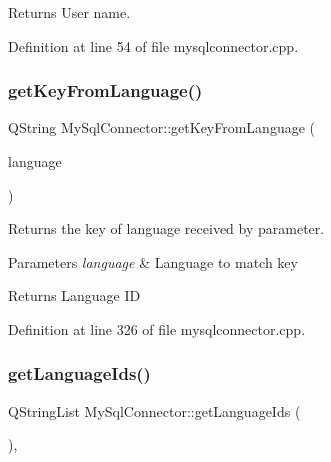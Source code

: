 \begin{DoxyReturn}{Returns}
User name. 
\end{DoxyReturn}


Definition at line 54 of file mysqlconnector.\+cpp.

\mbox{\label{classMySqlConnector_a16a6f0883e2b384621e738f78c619af6}} 
\subsubsection{\texorpdfstring{get\+Key\+From\+Language()}{getKeyFromLanguage()}}
{\footnotesize\ttfamily Q\+String My\+Sql\+Connector\+::get\+Key\+From\+Language (\begin{DoxyParamCaption}\item[{const Q\+String}]{language }\end{DoxyParamCaption})}



Returns the key of language received by parameter. 


\begin{DoxyParams}{Parameters}
{\em language} & Language to match key \\
\hline
\end{DoxyParams}
\begin{DoxyReturn}{Returns}
Language ID 
\end{DoxyReturn}


Definition at line 326 of file mysqlconnector.\+cpp.

\mbox{\label{classMySqlConnector_a3493828360c7edd217461e040fc1b00e}} 
\subsubsection{\texorpdfstring{get\+Language\+Ids()}{getLanguageIds()}}
{\footnotesize\ttfamily Q\+String\+List My\+Sql\+Connector\+::get\+Language\+Ids (\begin{DoxyParamCaption}{ }\end{DoxyParamCaption})\hspace{0.3cm}{\ttfamily [override]}, {\ttfamily [virtual]}}



